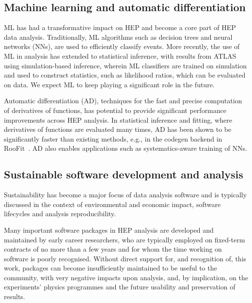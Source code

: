 \documentclass[10pt,a4paper]{article}
\begin{document}
\subsection{Machine learning and automatic
differentiation}\label{machine-learning-and-automatic-differentiation}

ML has had a transformative impact on HEP and become a core part of HEP data
analysis. Traditionally, ML algorithms such as decision trees and neural
networks (NNs), are used to efficiently classify events. More recently, the use
of ML in analysis has extended to statistical inference, with results from
ATLAS~\cite{ATLAS:2024_hzz_higgs, ATLAS:neural_sim_inference}
using simulation-based inference, wherein ML classifiers are trained on
simulation and used to construct statistics, such as likelihood ratios, which
can be evaluated on data. We expect ML to keep playing a significant role in the
future.

Automatic differentiation (AD), techniques for the fast and precise computation
of derivatives of functions, has potential to provide significant performance
improvements across HEP analysis. In statistical inference and fitting, where
derivatives of functions are evaluated many times, AD has been shown to be
significantly faster than existing methods, e.g., in the codegen backend in
RooFit~\cite{Hageboeck:2020dyv}. AD also enables applications such as
systematics-aware training of NNs.

\subsection{Sustainable software development and
analysis}\label{sustainable-software-development-and-analysis}

Sustainability has become a major focus of data analysis software and is
typically discussed in the context of environmental and economic impact,
software lifecycles and analysis reproducibility.

Many important software packages in HEP analysis are developed and
maintained by early career researchers, who are typically employed on
fixed-term contracts of no more than a few years and for whom the time
working on software is poorly recognised. Without direct support for,
and recognition of, this work, packages can become insufficiently
maintained to be useful to the community, with very negative
impacts upon analysis, and, by implication, on the experiments' physics
programmes and the future usability and preservation of results.
\end{document}

